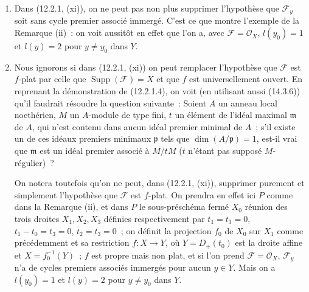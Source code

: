\begin{remarks}[12.2.3]
\begin{enumerate}[label=(\roman*)]
  \item Dans (12.2.1, (xi)), on ne peut pas non plus supprimer l'hypothèse que
  $\mathcal F_y$ soit sans cycle premier associé immergé. C'est ce que montre
  l'exemple de la Remarque (ii)~: on voit aussitôt en effet que l'on a, avec
  $\mathcal F=\mathcal O_X$, $l(y_0)=1$ et $l(y)=2$ pour $y\neq y_0$ dans $Y$.

  \item Nous ignorons si dans (12.2.1, (xi)) on peut remplacer l'hypothèse que
  $\mathcal F$ est $f$-plat par celle que $\operatorname{Supp}(\mathcal F)=X$
  et que $f$ est universellement ouvert. En reprenant la démonstration de
  (12.2.1.4), on voit (en utilisant aussi (14.3.6)) qu'il faudrait résoudre la
  question suivante~: Soient $A$ un anneau local noethérien, $M$ un $A$-module
  de type fini, $t$ un élément de l'idéal maximal $\mathfrak m$ de $A$, qui
  n'est contenu dans aucun idéal premier minimal de $A$~; s'il existe un de ces
  idéaux premiers minimaux $\mathfrak p$ tels que $\dim(A/\mathfrak p)=1$,
  est-il vrai que $\mathfrak m$ est un idéal premier associé à $M/tM$ ($t$
  n'étant pas supposé $M$-régulier)~?

  On notera toutefois qu'on ne peut, dans (12.2.1, (xi)), supprimer purement et
  simplement l'hypothèse que $\mathcal F$ est $f$-plat. On prendra en effet ici
  $P$ comme dans la Remarque (ii), et dans $P$ le sous-préschéma fermé $X_0$
  réunion des trois droites $X_1,X_2,X_3$ définies respectivement par
  $t_1=t_3=0$, $t_1-t_0=t_3=0$, $t_2=t_3=0$~; on définit la projection $f_0$ de
  $X_0$ sur $X_1$ comme précédemment et sa restriction $f:X\to Y$, où
  $Y=D_+(t_0)$ est la droite affine et $X=f_0^{-1}(Y)$~; $f$ est propre mais
  non plat, et si l'on prend $\mathcal F=\mathcal O_X$, $\mathcal F_y$ n'a de
  cycles premiers associés immergés pour aucun $y\in Y$. Mais on a $l(y_0)=1$
  et $l(y)=2$ pour $y\neq y_0$ dans $Y$.
\end{enumerate}
\end{remarks}

